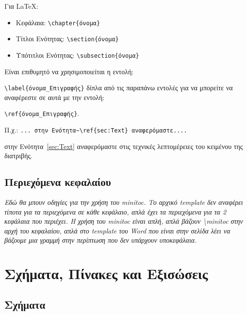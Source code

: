 \color{black}
\y Για \LaTeX:

\begin{itemize}
\item Κεφάλαια: \verb"\chapter{όνομα}"
\item Τίτλοι Ενότητας: \verb"\section{όνομα}"
\item Υπότιτλοι Ενότητας: \verb"\subsection{όνομα}"
\end{itemize}

\noindent Είναι επιθυμητό να χρησιμοποιείται η εντολή:

\chl \verb"\label{όνομα_Επιγραφής}" δίπλα από τις παραπάνω
εντολές για να μπορείτε να αναφέρεστε σε αυτά με την εντολή:

\chl \verb"\ref{όνομα_Επιγραφής}".

\chl Π.χ.: \verb"... στην Ενότητα~\ref{sec:Text} αναφερόμαστε...."

\chl στην Ενότητα~\ref{sec:Text} αναφερόμαστε στις τεχνικές
λεπτομέρειες του κειμένου της διατριβής.

\subsection{Περιεχόμενα κεφαλαίου}
\label{subsec:minitoc}
{\color{red}
\textit{Εδώ θα μπουν οδηγίες για την χρήση του minitoc. Το αρχικό
template δεν αναφέρει τίποτα για τα περιεχόμενα σε κάθε κεφάλαιο,
απλά έχει τα περιεχόμενα για τα 2 κεφάλαια που περιέχει. Η χρήση
του minitoc είναι απλή, απλά βάζουν \textbackslash minitoc στην αρχή του κεφαλαίου,
απλά στο template του Word που είναι στην σελίδα λέει να βάζουμε μια
γραμμή στην περίπτωση που δεν υπάρχουν υποκεφάλαια.}}


\section{Σχήματα, Πίνακες και Εξισώσεις}
\label{sec:Inclusion}

\subsection{Σχήματα}
\label{subsec:Figures}

